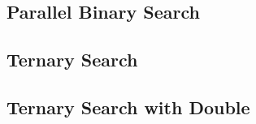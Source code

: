 \subsection{Parallel Binary Search}
\raggedbottom
\hrulefill
\subsection{Ternary Search}
\raggedbottom
\hrulefill
\subsection{Ternary Search with Double}
\raggedbottom
\hrulefill

